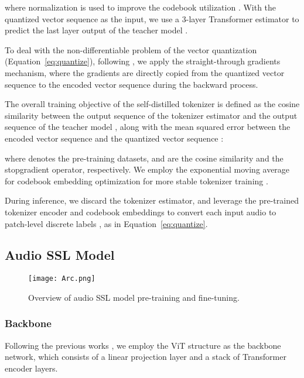 \documentclass{article}
\theoremstyle{plain}
\theoremstyle{definition}
\theoremstyle{remark}
\begin{document}
where  normalization is used to improve the codebook utilization \citep{yu2021vector,beitv2}. 
With the quantized vector sequence  as the input, we use a 3-layer Transformer estimator to predict the last layer output of the teacher model .

To deal with the non-differentiable problem of the vector quantization (Equation~\ref{eq:quantize}), following \citet{van2017neural}, we apply the straight-through gradients mechanism, where the gradients are directly copied from the quantized vector sequence  to the encoded vector sequence  during the backward process. 

The overall training objective of the self-distilled tokenizer is defined as the cosine similarity between the output sequence of the tokenizer estimator  and the output sequence of the teacher model , along with the mean squared error between the encoded vector sequence  and the quantized vector sequence :

where  denotes the pre-training datasets,  and  are the cosine similarity and the stopgradient operator, respectively. We  employ the exponential moving average \citep{van2017neural} for codebook embedding optimization for more stable tokenizer training \citep{beitv2}.

During inference, we discard the tokenizer estimator, and leverage the pre-trained tokenizer encoder and codebook embeddings to convert each input audio  to patch-level discrete labels , as in Equation~\ref{eq:quantize}.

\subsection{Audio SSL Model}
\label{ssec:sslmodel}

\begin{figure*}[t]
	\centering
	\texttt{[image: Arc.png]}
	\caption{Overview of audio SSL model pre-training and fine-tuning.}\label{fig:architecture}
\end{figure*}

\subsubsection{Backbone}

Following the previous works \citep{gong2021ast,gong2022ssast,xu2022masked}, we employ the ViT structure \citep{vit} as the backbone network, which consists of a linear projection layer and a stack of Transformer encoder layers.
\end{document}
